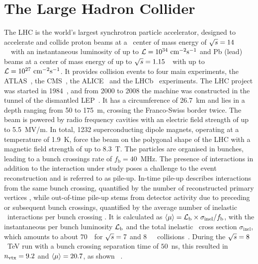\section{The Large Hadron Collider}
%
The \gls{LHC} is the world's largest synchrotron particle accelerator, designed to accelerate and collide proton beams at a \pp\ center of mass energy of ${\sqrt{s}}=14$~\TeV\ with an instantaneous luminosity of up to $\mathcal L = 10^{34}~\mathrm{cm}^{-2} \mathrm{s}^{-1}$ and Pb (lead) beams at a center of mass energy of up to ${\sqrt{s}}=1.15$~\PeV\ with up to $\mathcal L = 10^{27}~\mathrm{cm}^{-2} \mathrm{s}^{-1}$. It provides collision events to four main experiments, the \gls{ATLAS}~\cite{atlasexp}, the \gls{CMS}~\cite{cmsexp}, the \gls{ALICE}~\cite{aliceexp} and the \gls{LHCb}~\cite{lhcbexp} experiments. The \gls{LHC} project was started in 1984~\cite{Asner:1984jv}, and from 2000 to 2008 the machine was constructed in the tunnel of the dismantled \gls{LEP}~\cite{CERN1984}. It has a circumference of 26.7~km and lies in a depth ranging from 50 to 175~m, crossing the Franco-Swiss border twice. The beam is powered by radio frequency cavities with an electric field strength of up to 5.5~MV/m. In total, 1232 superconducting dipole magnets, operating at a temperature of 1.9~K, force the beam on the polygonal shape of the \gls{LHC} with a magnetic field strength of up to 8.3~T. The particles are organised in bunches, leading to a bunch crossings rate of $f_\mathrm{b}=40$~MHz. 
%
The presence of interactions in addition to the interaction under study poses a challenge to the event reconstruction and is referred to as pile-up. In-time pile-up describes interactions from the same bunch crossing, quantified by the number of reconstructed primary vertices \nvtx, while out-of-time pile-up stems from detector activity due to preceding or subsequent bunch crossings, quantified by the average number of inelastic \pp\ interactions per bunch crossing \meanmu. It is calculated as $\langle\mu\rangle=\mathcal L_\mathrm{b}\times \sigma_\mathrm{inel}/f_\mathrm{b}$, with the instantaneous per bunch luminosity $\mathcal L_\mathrm{b}$ and the total inelastic \pp\ cross section $ \sigma_\mathrm{inel}$, which amounts to about $70$~\mb\ for ${\sqrt{s}}=7$ and $8$~\TeV\ \pp\ collisions~\cite{ATLAS-CONF-2013-083,Aad:2013ucp}.
%
During the ${\sqrt{s}}=8$~TeV run with a bunch crossing separation time of $50$~ns, this resulted in $n_\mathrm{vtx}=9.2$ and $\langle\mu\rangle=20.7$, as shown \fig~.
%
